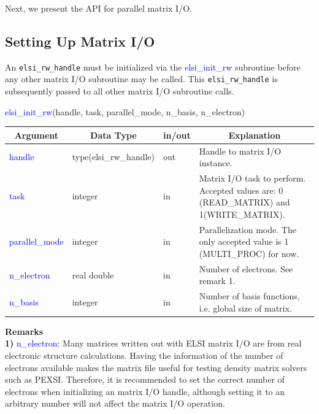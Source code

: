 \documentclass{report}
\begin{document}
Next, we present the API for parallel matrix I/O.\\

\subsection{Setting Up Matrix I/O}
\label{subsec:rw_init}
An \texttt{elsi\_rw\_handle} must be initialized via the \textcolor{blue}{elsi\_init\_rw} subroutine before any other matrix I/O subroutine may be called.  This \texttt{elsi\_rw\_handle} is subsequently passed to all other matrix I/O subroutine calls.\\

\begin{labeling}{\hspace{6cm}}
\item [\hspace{0.3cm} \textcolor{blue}{elsi\_init\_rw}(handle, task, parallel\_mode, n\_basis, n\_electron)]
\end{labeling}

\begin{tabular}[]{|p{20mm}|p{45mm}|p{15mm}|p{85mm}|}
\hline
\multicolumn{1}{|c|}{\textbf{Argument}} & \multicolumn{1}{c|}{\textbf{Data Type}} & \multicolumn{1}{c|}{\textbf{in/out}} & \multicolumn{1}{c|}{\textbf{Explanation}}\\
\hline
\textcolor{blue}{handle}         & type(elsi\_rw\_handle) & out & Handle to matrix I/O instance.\\
\hline
\textcolor{blue}{task}           & integer                & in  & Matrix I/O task to perform.  Accepted values are:  0 (READ\_MATRIX) and 1(WRITE\_MATRIX).\\
\hline
\textcolor{blue}{parallel\_mode} & integer                & in  & Parallelization mode.  The only accepted value is 1 (MULTI\_PROC) for now.\\
\hline
\textcolor{blue}{n\_electron}    & real double            & in  & Number of electrons.  See remark 1.\\
\hline
\textcolor{blue}{n\_basis}       & integer                & in  & Number of basis functions, i.e. global size of matrix.\\
\hline
\end{tabular}

\bigskip
\textbf{Remarks}\\

\textbf{1)} \textcolor{blue}{n\_electron}:  Many matrices written out with ELSI matrix I/O are from real electronic structure calculations.  Having the information of the number of electrons available makes the matrix file useful for testing density matrix solvers such as PEXSI.  Therefore, it is recommended to set the correct number of electrons when initializing an matrix I/O handle, although setting it to an arbitrary number will not affect the matrix I/O operation.\\
\end{document}
